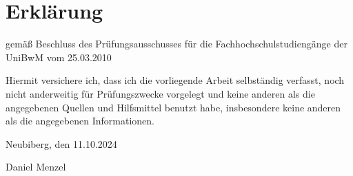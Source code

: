 \chapter*{Erklärung}
\thispagestyle{empty} %
gemäß Beschluss des Prüfungsausschusses für die Fachhochschulstudiengänge der UniBwM vom 25.03.2010


Hiermit versichere ich, dass ich die vorliegende Arbeit selbständig verfasst, noch nicht
anderweitig für Prüfungszwecke vorgelegt und keine anderen als die angegebenen Quellen
und Hilfsmittel benutzt habe, insbesondere keine anderen als die angegebenen Informationen.

\vspace{1cm} %
Neubiberg, den 11.10.2024

\vspace{1cm} %
\noindent\makebox[2in]{\hrulefill} %

Daniel Menzel

